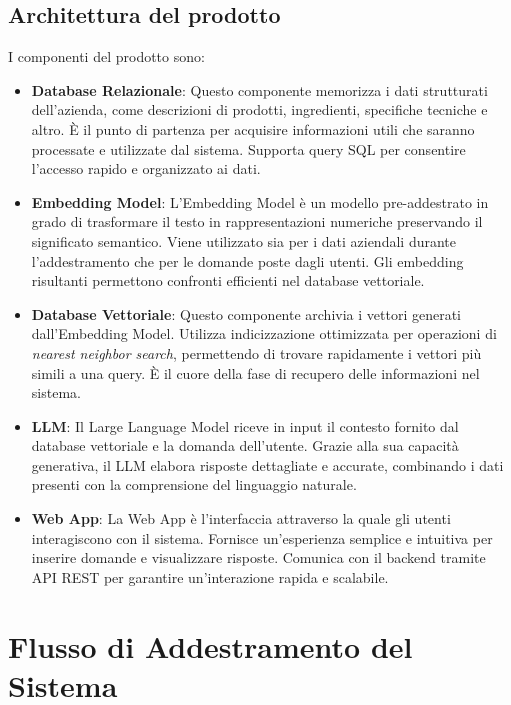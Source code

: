 \subsection{Architettura del prodotto}
I componenti del prodotto sono:
\begin{itemize}
    \item \textbf{Database Relazionale}:  
    Questo componente memorizza i dati strutturati dell’azienda, come descrizioni di prodotti, ingredienti, specifiche tecniche e altro. È il punto di partenza per acquisire informazioni utili che saranno processate e utilizzate dal sistema. Supporta query SQL per consentire l'accesso rapido e organizzato ai dati.
    
    \item \textbf{Embedding Model}:  
    L’Embedding Model è un modello pre-addestrato in grado di trasformare il testo in rappresentazioni numeriche preservando il significato semantico. Viene utilizzato sia per i dati aziendali durante l’addestramento che per le domande poste dagli utenti. Gli embedding risultanti permettono confronti efficienti nel database vettoriale.
    
    \item \textbf{Database Vettoriale}:  
    Questo componente archivia i vettori generati dall’Embedding Model. Utilizza indicizzazione ottimizzata per operazioni di \textit{nearest neighbor search}, permettendo di trovare rapidamente i vettori più simili a una query. È il cuore della fase di recupero delle informazioni nel sistema.
    
    \item \textbf{LLM}:  
    Il Large Language Model riceve in input il contesto fornito dal database vettoriale e la domanda dell’utente. Grazie alla sua capacità generativa, il LLM elabora risposte dettagliate e accurate, combinando i dati presenti con la comprensione del linguaggio naturale.
    
    \item \textbf{Web App}:  
    La Web App è l’interfaccia attraverso la quale gli utenti interagiscono con il sistema. Fornisce un’esperienza semplice e intuitiva per inserire domande e visualizzare risposte. Comunica con il backend tramite API REST per garantire un'interazione rapida e scalabile.
\end{itemize}

\section*{Flusso di Addestramento del Sistema}

